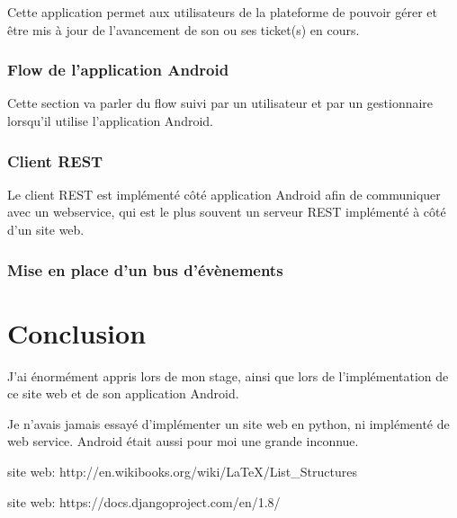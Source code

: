 \documentclass[12pt,table,a4paper]{report}
\begin{document}
Cette application permet aux utilisateurs de la plateforme de pouvoir gérer et être mis à jour de l'avancement de son ou ses ticket(s) en cours.

\subsection{Flow de l'application Android}
Cette section va parler du flow suivi par un utilisateur et par un gestionnaire lorsqu'il utilise l'application Android.

\subsection{Client REST}
Le client REST est implémenté côté application Android afin de communiquer avec un webservice, qui est le plus souvent un serveur REST implémenté à côté d'un site web.

\subsection{Mise en place d'un bus d'évènements}

\chapter{Conclusion}
J'ai énormément appris lors de mon stage, ainsi que lors de l'implémentation de ce site web et de son application Android.

Je n'avais jamais essayé d'implémenter un site web en python, ni implémenté de web service. Android était aussi pour moi une grande inconnue.

\begin{thebibliography}{breitestes Label}
	site web: http://en.wikibooks.org/wiki/LaTeX/List\_Structures
	
		site web: https://docs.djangoproject.com/en/1.8/
\end{thebibliography}
\end{document}
